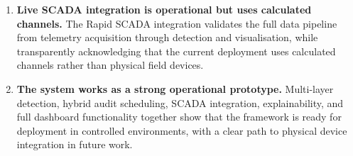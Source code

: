 \begin{enumerate}
    \item \textbf{Live SCADA integration is operational but uses calculated channels.} The Rapid SCADA integration validates the full data pipeline from telemetry acquisition through detection and visualisation, while transparently acknowledging that the current deployment uses calculated channels rather than physical field devices.

    \item \textbf{The system works as a strong operational prototype.} Multi-layer detection, hybrid audit scheduling, SCADA integration, explainability, and full dashboard functionality together show that the framework is ready for deployment in controlled environments, with a clear path to physical device integration in future work.
\end{enumerate}
